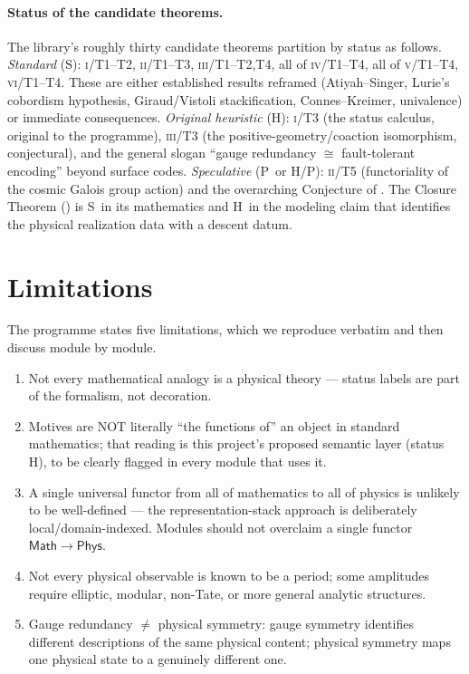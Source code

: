 \documentclass[12pt]{article}
\theoremstyle{definition}
\theoremstyle{remark}
\newcommand{\Math}{\mathsf{Math}}
\newcommand{\Phys}{\mathsf{Phys}}
\newcommand{\Sstat}{\textsf{S}}
\newcommand{\Hstat}{\textsf{H}}
\newcommand{\Pstat}{\textsf{P}}
\newcommand{\PI}{\textsc{i}}
\newcommand{\PII}{\textsc{ii}}
\newcommand{\PIII}{\textsc{iii}}
\newcommand{\PIV}{\textsc{iv}}
\newcommand{\PV}{\textsc{v}}
\newcommand{\PVI}{\textsc{vi}}
\begin{document}
\paragraph{Status of the candidate theorems.}
The library's roughly thirty candidate theorems partition by status as follows.
\emph{Standard} (\Sstat): \PI/T1--T2, \PII/T1--T3, \PIII/T1--T2,T4, all of
\PIV/T1--T4, all of \PV/T1--T4, \PVI/T1--T4.  These are either established results
reframed (Atiyah--Singer, Lurie's cobordism hypothesis, Giraud/Vistoli stackification,
Connes--Kreimer, univalence) or immediate consequences.  \emph{Original heuristic}
(\Hstat): \PI/T3 (the status calculus, original to the programme), \PIII/T3 (the
positive-geometry/coaction isomorphism, conjectural), and the general slogan ``gauge
redundancy $\cong$ fault-tolerant encoding'' beyond surface codes.  \emph{Speculative}
(\Pstat\ or \Hstat/\Pstat): \PII/T5 (functoriality of the cosmic Galois group action)
and the overarching Conjecture of .  The Closure Theorem
() is \Sstat\ in its mathematics and \Hstat\ in the modeling claim
that identifies the physical realization data with a descent datum.

\section{Limitations}
\label{sec:limitations}

The programme states five limitations, which we reproduce verbatim and then discuss
module by module.

\begin{enumerate}[leftmargin=2.2em, label=\textbf{L\arabic*.}]
\item Not every mathematical analogy is a physical theory --- status labels are part of
the formalism, not decoration.
\item Motives are NOT literally ``the functions of'' an object in standard mathematics;
that reading is this project's proposed semantic layer (status \Hstat), to be clearly
flagged in every module that uses it.
\item A single universal functor from all of mathematics to all of physics is unlikely
to be well-defined --- the representation-stack approach is deliberately
local/domain-indexed.  Modules should not overclaim a single functor
$\Math\to\Phys$.
\item Not every physical observable is known to be a period; some amplitudes require
elliptic, modular, non-Tate, or more general analytic structures.
\item Gauge redundancy $\neq$ physical symmetry: gauge symmetry identifies different
descriptions of the same physical content; physical symmetry maps one physical state to
a genuinely different one.
\end{enumerate}
\end{document}
